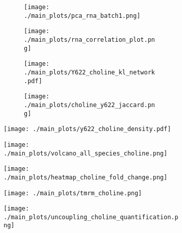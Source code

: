 \begin{figure}[ht]
    \begin{subfigure}[t]{.2\textwidth}
        \begin{subfigure}[t]{\textwidth}
            \caption{}
            \texttt{[image: ./main\_plots/pca\_rna\_batch1.png]}        
        \end{subfigure}  
            \begin{subfigure}[t]{\textwidth}
            \caption{}
            \texttt{[image: ./main\_plots/rna\_correlation\_plot.png]}        
        \end{subfigure}  
    \end{subfigure}  
    \begin{subfigure}[t]{.2\textwidth}
        \begin{subfigure}[t]{\textwidth}
            \caption{}
            \texttt{[image: ./main\_plots/Y622\_choline\_kl\_network.pdf]}        
        \end{subfigure}  
            \begin{subfigure}[t]{\textwidth}
            \caption{}
            \texttt{[image: ./main\_plots/choline\_y622\_jaccard.png]}        
        \end{subfigure}  
    \end{subfigure} 
    \begin{subfigure}[t]{.4\textwidth}
        \caption{}
        \texttt{[image: ./main\_plots/y622\_choline\_density.pdf]}        
    \end{subfigure}  
    

    \begin{subfigure}[t]{.25\textwidth}
        \caption{}
        \texttt{[image: ./main\_plots/volcano\_all\_species\_choline.png]}        
    \end{subfigure}  
    \begin{subfigure}[t]{.15\textwidth}
        \caption{}
        \texttt{[image: ./main\_plots/heatmap\_choline\_fold\_change.png]}        
    \end{subfigure}  
    \begin{subfigure}[t]{.37\textwidth}
        \caption{}
        \texttt{[image: ./main\_plots/tmrm\_choline.png]}        
    \end{subfigure}  
    \begin{subfigure}[t]{.17\textwidth}
        \caption{}
        \texttt{[image: ./main\_plots/uncoupling\_choline\_quantification.png]}        
    \end{subfigure}  


\end{figure}
